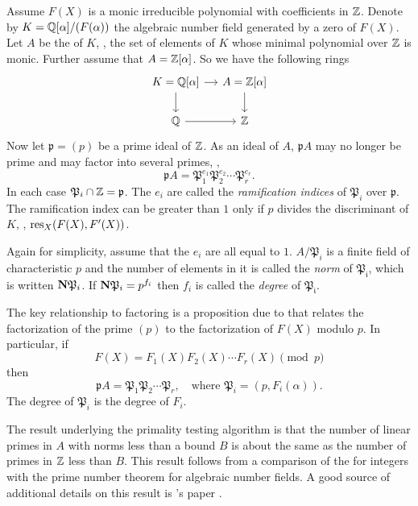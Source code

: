 Assume $F(X)$ is a monic irreducible polynomial with coefficients in
$\mathbb{Z}$.  Denote by $K = \mathbb{Q}[\alpha]/(F(\alpha))$ the algebraic number field
generated by a zero of $F(X)$.  Let $A$ be the 
of $K$, \ie, the set of elements of $K$ whose minimal polynomial over
$\mathbb{Z}$ is monic.  Further assume that $A = \mathbb{Z}[\alpha]$.  So we have the
following rings
\[
\begin{tikzcd}[column sep=small]
K =\Q[\alpha] \arrow{r}\arrow{d}   & A =\Z[\alpha]\arrow{d}\\
\Q\arrow{r} & \Z
\end{tikzcd}
\]
Now let $\mathfrak{p} = (p)$ be a prime ideal of $\mathbb{Z}$.  As an ideal of
$A$, $\mathfrak{p}A$ may no longer be prime and may factor into several
primes, \ie, 
\[
\mathfrak{p}A = \mathfrak{P}_1^{e_1} \mathfrak{P}_2^{e_2} \cdots \mathfrak{P}_r^{e_r}.
\]
In each case $\mathfrak{P}_i \cap \mathbb{Z} = \mathfrak{p}$.  The $e_i$ are called
the {\em ramification indices} of $\mathfrak{P}_i$
over $\mathfrak{p}$.  The ramification index can be greater than $1$ only
if $p$ divides the discriminant of $K$, \ie, $\mathop{\rm res}\nolimits_X(F(X), F'(X))$.

Again for simplicity, assume that the $e_i$ are all equal to $1$.
$A/\mathfrak{P}_i$ is a finite field of characteristic $p$ and the number
of elements in it is called the {\em norm} of $\mathfrak{P_i}$,
 which is written ${\bf N} \mathfrak{P}_i$.  If
${\bf N} \mathfrak{P}_i = p^{f_i}$ then $f_i$ is called the {\em degree}
of $\mathfrak{P_i}$.

The key relationship to factoring is a proposition due to {\Dedekind}
\cite{Dedekind1878-xs} that relates the factorization of the prime $(p)$ to the
factorization of $F(X)$ modulo $p$.  In particular, if
\[
F(X) = F_1(X) F_2(X) \cdots F_r(X) \pmod{p}
\]
then
\[
\mathfrak{p}A = \mathfrak{P}_1 \mathfrak{P}_2 \cdots \mathfrak{P}_r,
\quad\mbox{where $\mathfrak{P}_i = (p, F_i(\alpha))$.}
\]
The degree of $\mathfrak{P}_i$ is the degree of $F_i$.

The result underlying the primality testing algorithm is that the
number of linear primes in $A$ with norms less than a bound $B$ is
about the same as the number of primes in $\mathbb{Z}$ less than $B$.  This
result follows from a comparison of the 
for integers with the prime number theorem for algebraic number
fields.  A good source of additional details on this result is
{\Heilbronn}'s paper \cite{Heilbronn1967-uq}.

